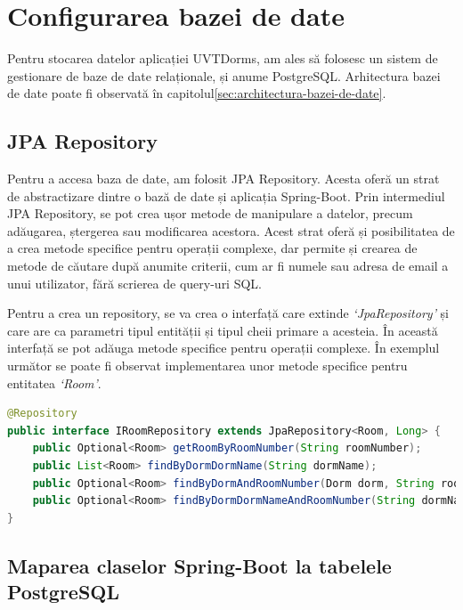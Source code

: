 \documentclass[12pt,a4paper]{report}
\theoremstyle{definition}
\theoremstyle{remark}
\begin{document}
\section{Configurarea bazei de date}

\par Pentru stocarea datelor aplicației UVTDorms, am ales să folosesc un sistem de gestionare de baze de date relaționale, și anume PostgreSQL\cite{drake2002practical}. Arhitectura bazei de date poate fi observată în capitolul\ref{sec:architectura-bazei-de-date}.

\subsection{JPA Repository}

\par Pentru a accesa baza de date, am folosit JPA Repository\cite{gierke2012spring}. Acesta oferă un strat de abstractizare dintre o bază de date și aplicația Spring-Boot. Prin intermediul JPA Repository, se pot crea ușor metode de manipulare a datelor, precum adăugarea, ștergerea sau modificarea acestora. Acest strat oferă și posibilitatea de a crea metode specifice pentru operații complexe, dar permite și crearea de metode de căutare după anumite criterii, cum ar fi numele sau adresa de email a unui utilizator, fără scrierea de query-uri SQL\@.

\par Pentru a crea un repository, se va crea o interfață care extinde \textit{`JpaRepository'} și care are ca parametri tipul entității și tipul cheii primare a acesteia. În această interfață se pot adăuga metode specifice pentru operații complexe. În exemplul următor se poate fi observat implementarea unor metode specifice pentru entitatea \textit{`Room'}.

\begin{lstlisting}[language=Java, caption={Interfața JPA Repository pentru entitatea Room}]
@Repository
public interface IRoomRepository extends JpaRepository<Room, Long> {
    public Optional<Room> getRoomByRoomNumber(String roomNumber);
    public List<Room> findByDormDormName(String dormName);
    public Optional<Room> findByDormAndRoomNumber(Dorm dorm, String roomNumber);
    public Optional<Room> findByDormDormNameAndRoomNumber(String dormName, String roomNumber);
}
\end{lstlisting}

\subsection{Maparea claselor Spring-Boot la tabelele PostgreSQL}
\end{document}
